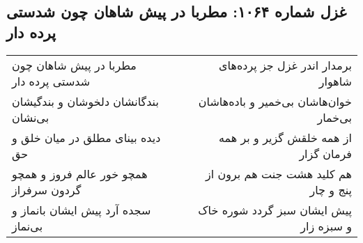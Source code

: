 \begin{center}
\section*{غزل شماره ۱۰۶۴: مطربا در پیش شاهان چون شدستی پرده دار}
\label{sec:1064}
\begin{longtable}{l p{0.5cm} r}
مطربا در پیش شاهان چون شدستی پرده دار
&&
برمدار اندر غزل جز پرده‌های شاهوار
\\
بندگانشان دلخوشان و بندگیشان بی‌نشان
&&
خوان‌هاشان بی‌خمیر و باده‌هاشان بی‌خمار
\\
دیده بینای مطلق در میان خلق و حق
&&
از همه خلقش گزیر و بر همه فرمان گزار
\\
همچو خور عالم فروز و همچو گردون سرفراز
&&
هم کلید هشت جنت هم برون از پنج و چار
\\
سجده آرد پیش ایشان بانماز و بی‌نماز
&&
پیش ایشان سبز گردد شوره خاک و سبزه زار
\\
\end{longtable}
\end{center}
